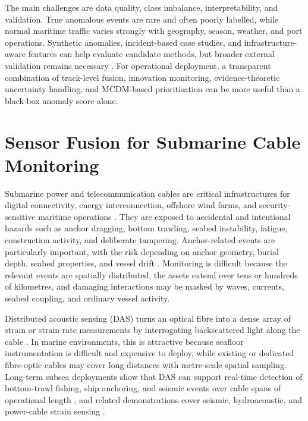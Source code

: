 \documentclass[graybox,envcountchap]{style/SNmono}
\begin{document}
The main challenges are data quality, class imbalance, interpretability, and validation. True anomalous events are rare and often poorly labelled, while normal maritime traffic varies strongly with geography, season, weather, and port operations. Synthetic anomalies, incident-based case studies, and infrastructure-aware features can help evaluate candidate methods, but broader external validation remains necessary \cite{oliva_tomei_prm_access_2026}. For operational deployment, a transparent combination of track-level fusion, innovation monitoring, evidence-theoretic uncertainty handling, and MCDM-based prioritisation can be more useful than a black-box anomaly score alone.

\section{Sensor Fusion for Submarine Cable Monitoring}

Submarine power and telecommunication cables are critical infrastructures for digital connectivity, energy interconnection, offshore wind farms, and security-sensitive maritime operations \cite{carter_submarine_2009,kavanagh_achieving_2025}. They are exposed to accidental and intentional hazards such as anchor dragging, bottom trawling, seabed instability, fatigue, construction activity, and deliberate tampering. Anchor-related events are particularly important, with the risk depending on anchor geometry, burial depth, seabed properties, and vessel drift \cite{yoon_safety_2013,osthoff_anchor_soil_2017,li_anchor_risk_2025}. Monitoring is difficult because the relevant events are spatially distributed, the assets extend over tens or hundreds of kilometres, and damaging interactions may be masked by waves, currents, seabed coupling, and ordinary vessel activity.

Distributed acoustic sensing (DAS) turns an optical fibre into a dense array of strain or strain-rate measurements by interrogating backscattered light along the cable \cite{hartog_intro_2017,lu_distributed_2019,lindsey_fiberoptic_2021}. In marine environments, this is attractive because seafloor instrumentation is difficult and expensive to deploy, while existing or dedicated fibre-optic cables may cover long distances with metre-scale spatial sampling. Long-term subsea deployments show that DAS can support real-time detection of bottom-trawl fishing, ship anchoring, and seismic events over cable spans of operational length \cite{waagaard_longterm_2022}, and related demonstrations cover seismic, hydroacoustic, and power-cable strain sensing \cite{williams_distributed_2019,matsumoto_hydroacoustic_2021,masoudi_dynamic_2018}.
\end{document}
